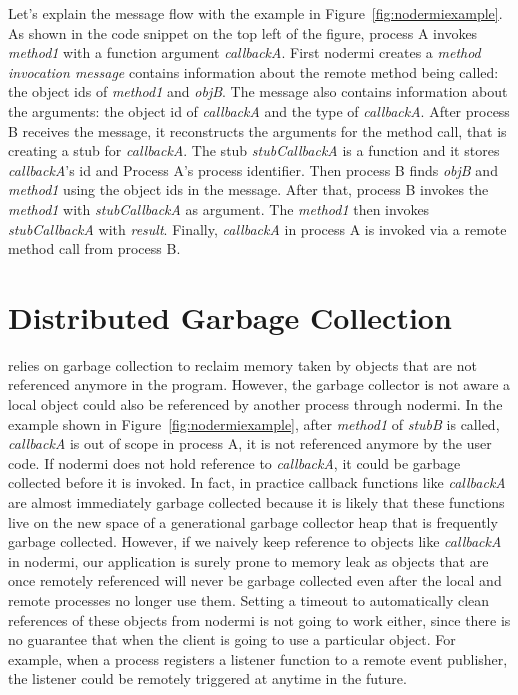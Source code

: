 Let's explain the message flow with the example
in Figure~\ref{fig:nodermiexample}.
As shown in the code snippet on the top left of the figure,
process A invokes \emph{method1} with a function argument \emph{callbackA}.
First nodermi creates a \emph{method invocation message}
contains information about the remote method being called:
the object ids of \emph{method1} and \emph{objB}.
The message also contains information about the arguments:
the object id of \emph{callbackA} and
the type of \emph{callbackA}.
After process B receives the message,
it reconstructs the arguments for the method call,
that is creating a stub for \emph{callbackA}.
The stub \emph{stubCallbackA} is a function and
it stores \emph{callbackA}'s id and Process A's process identifier.
Then process B finds \emph{objB} and \emph{method1} using the
object ids in the message.
After that,
process B invokes the \emph{method1} with \emph{stubCallbackA} as argument.
The \emph{method1} then invokes \emph{stubCallbackA} with \emph{result}.
Finally, \emph{callbackA} in process A
is invoked via a remote method call from process B.



\section{Distributed Garbage Collection}
\js{} relies on garbage collection to reclaim memory taken by
objects that are not referenced anymore in the program.
However, the garbage collector is not aware a local object
could also be referenced by another process through nodermi.
In the example shown in Figure~\ref{fig:nodermiexample},
after \emph{method1} of \emph{stubB} is called,
\emph{callbackA} is out of scope in process A,
it is not referenced anymore by the user code.
If nodermi does not hold reference to \emph{callbackA},
it could be garbage collected before it is invoked.
In fact, in practice callback functions like \emph{callbackA} are almost
immediately garbage collected because it is likely that these functions
live on the new space of a generational garbage collector heap that is frequently
garbage collected.
However, if we naively keep reference to objects like
 \emph{callbackA} in nodermi,
our application is surely prone to memory leak
as objects that are once remotely referenced
will never be garbage collected even after the local and remote processes
no longer use them.
Setting a timeout to automatically clean references of
these objects from nodermi is not going to work either,
since there is no guarantee that when the client is going to use a
particular object.
For example,
when a process registers a listener function to a remote event publisher,
the listener could be remotely triggered at anytime in the future.


